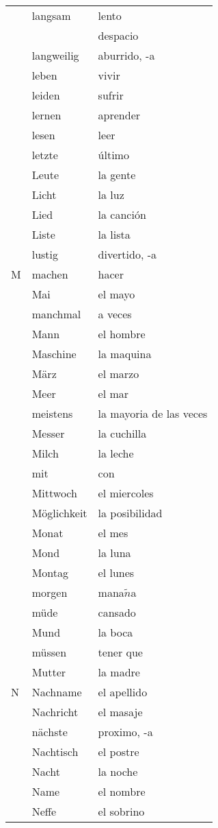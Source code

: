 \documentclass{spanish_summary}
\begin{document}
\begin{longtable}{p{} p{} | p{}}
& langsam & lento\\
& & despacio\\
& langweilig & aburrido, -a\\
& leben & vivir  \\
& leiden & sufrir  \\
& lernen & aprender  \\
& lesen & leer  \\
& letzte & último\\
& Leute & la gente \\
& Licht & la luz \\
& Lied & la canción \\
& Liste & la lista \\
& lustig & divertido, -a\\
M & machen & hacer  \\
& Mai & el mayo  \\
& manchmal & a veces  \\
& Mann & el hombre  \\
& Maschine & la maquina\\
& März & el marzo  \\
& Meer & el mar  \\
& meistens & la mayoria de las veces  \\
& Messer & la cuchilla  \\
& Milch & la leche  \\
& mit & con  \\
& Mittwoch & el miercoles  \\
& Möglichkeit & la posibilidad  \\
& Monat & el mes  \\
& Mond & la luna  \\
& Montag & el lunes  \\
& morgen & mana$\tilde{n}$a \\
& müde & cansado  \\
& Mund & la boca  \\
& müssen & tener que \\
& Mutter & la madre  \\
N & Nachname & el apellido  \\
& Nachricht & el masaje  \\
& nächste & proximo, -a\\
& Nachtisch & el postre  \\
& Nacht & la noche  \\
& Name & el nombre  \\
& Neffe & el sobrino  \\

\end{longtable}
\end{document}
